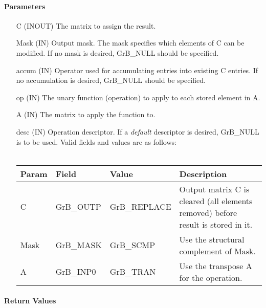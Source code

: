 \paragraph{Parameters}

\begin{itemize}[leftmargin=1.1in]
    \item[{\sf C}]     ({\sf INOUT}) The matrix to assign the result.

    \item[{\sf Mask}]  ({\sf IN}) Output mask. The mask
    specifies which elements of {\sf C} can be modified.
    If no mask is desired, {\sf GrB\_NULL} should be specified.

    \item[{\sf accum}] ({\sf IN}) Operator used for accumulating entries into existing {\sf C} entries. 
			If no accumulation is desired, {\sf GrB\_NULL} should be specified.

    \item[{\sf op}]    ({\sf IN}) The unary function (operation) to apply to each stored element in {\sf A}.
    \item[{\sf A}]     ({\sf IN}) The matrix to apply the function to.
    \item[{\sf desc}]  ({\sf IN}) Operation descriptor. If a
    \emph{default} descriptor is desired, {\sf GrB\_NULL} is to be
    used.  Valid fields and values are as follows: \\ ~\\
    \begin{tabular}{lllp{2.5in}}
    Param & Field  & Value & Description \\
    \hline
    {\sf C}    & {\sf GrB\_OUTP} & {\sf GrB\_REPLACE} & Output matrix {\sf C} is cleared (all elements removed) before result is stored in it. \\
    {\sf Mask} & {\sf GrB\_MASK} & {\sf GrB\_SCMP}    & Use the structural complement of {\sf Mask}. \\
    {\sf A}    & {\sf GrB\_INP0} & {\sf GrB\_TRAN}    & Use the transpose {\sf A} for the operation.\\
    \end{tabular}
\end{itemize}

\paragraph{Return Values}

